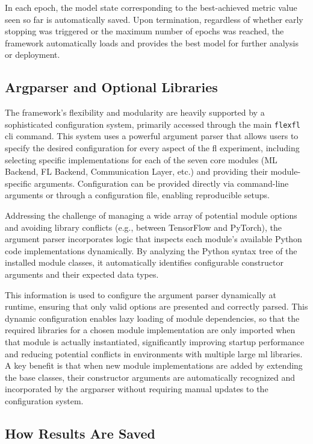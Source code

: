 In each epoch, the model state corresponding to the best-achieved metric value seen so far is automatically saved. Upon termination, regardless of whether early stopping was triggered or the maximum number of epochs was reached, the framework automatically loads and provides the best model for further analysis or deployment.

\subsection{Argparser and Optional Libraries}
\label{sec:argparser}

The framework's flexibility and modularity are heavily supported by a sophisticated configuration system, primarily accessed through the main \texttt{flexfl} \ac{cli} command. This system uses a powerful argument parser that allows users to specify the desired configuration for every aspect of the \ac{fl} experiment, including selecting specific implementations for each of the seven core modules (ML Backend, FL Backend, Communication Layer, etc.) and providing their module-specific arguments. Configuration can be provided directly via command-line arguments or through a configuration file, enabling reproducible setups.

Addressing the challenge of managing a wide array of potential module options and avoiding library conflicts (e.g., between TensorFlow and PyTorch), the argument parser incorporates logic that inspects each module's available Python code implementations dynamically. By analyzing the Python syntax tree of the installed module classes, it automatically identifies configurable constructor arguments and their expected data types. 

This information is used to configure the argument parser dynamically at runtime, ensuring that only valid options are presented and correctly parsed. This dynamic configuration enables lazy loading of module dependencies, so that the required libraries for a chosen module implementation are only imported when that module is actually instantiated, significantly improving startup performance and reducing potential conflicts in environments with multiple large \ac{ml} libraries. A key benefit is that when new module implementations are added by extending the base classes, their constructor arguments are automatically recognized and incorporated by the argparser without requiring manual updates to the configuration system.

\subsection{How Results Are Saved}
\label{sec:results-saving}

